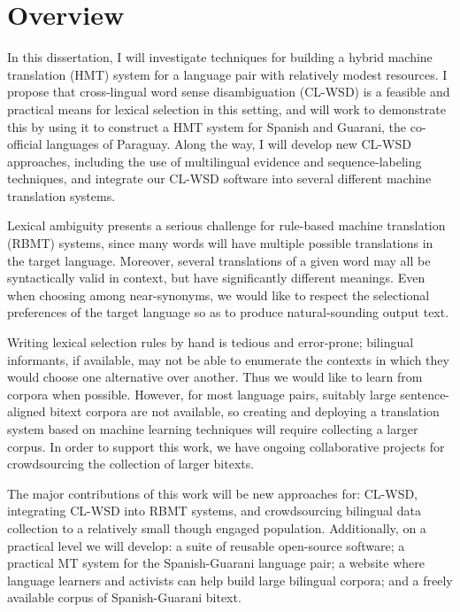 \section{Overview}
In this dissertation, I will investigate techniques for building a hybrid
machine translation (HMT) system for a language pair with relatively modest
resources.
I propose that cross-lingual word sense disambiguation (CL-WSD) is a feasible
and practical means for lexical selection in this setting, and will work to
demonstrate this by using it to construct a HMT system for Spanish and Guarani,
the co-official languages of Paraguay.
Along the way, I will develop new CL-WSD approaches, including the use of
multilingual evidence and sequence-labeling techniques, and integrate our
CL-WSD software into several different machine translation systems.

Lexical ambiguity presents a serious challenge for rule-based machine
translation (RBMT) systems, since many words will have multiple possible
translations in the target language. Moreover, several translations of a given
word may all be syntactically valid in context, but have significantly
different meanings. Even when choosing among near-synonyms, we would like to
respect the selectional preferences of the target language so as to produce
natural-sounding output text.

Writing lexical selection rules by hand is tedious and error-prone; bilingual
informants, if available, may not be able to enumerate the contexts in which
they would choose one alternative over another. Thus we would like to learn
from corpora when possible. However, for most language pairs, suitably large
sentence-aligned bitext corpora are not available, so creating and deploying a
translation system based on machine learning techniques will require collecting
a larger corpus. In order to support this work, we have ongoing collaborative
projects for crowdsourcing the collection of larger bitexts.

The major contributions of this work will be new approaches for: CL-WSD,
integrating CL-WSD into RBMT systems, and crowdsourcing bilingual data
collection to a relatively small though engaged population.
Additionally, on a practical level we will develop: a suite of reusable
open-source software; a practical MT system for the Spanish-Guarani language
pair; a website where language learners and activists can help build large
bilingual corpora; and a freely available corpus of Spanish-Guarani bitext.


